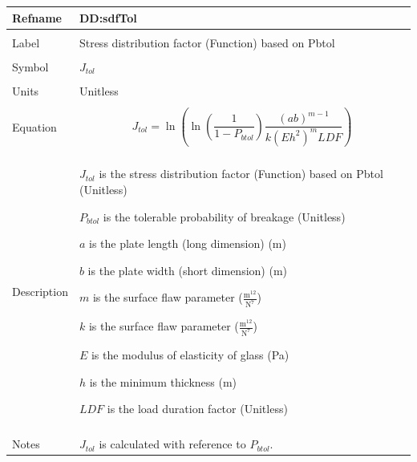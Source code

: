 \documentclass[12pt]{article}
\begin{document}
\noindent \begin{minipage}{\textwidth}
\begin{tabular}{>{\raggedright}p{}>{\raggedright\arraybackslash}p{}}
\toprule \textbf{Refname} & \textbf{DD:sdfTol}
\label{DD:sdfTol}
\\ \midrule \\
Label & Stress distribution factor (Function) based on Pbtol
        
\\ \midrule \\
Symbol & ${J_{tol}}$
         
\\ \midrule \\
Units & Unitless
        
\\ \midrule \\
Equation & \begin{displaymath}
           {J_{tol}}=\ln\left(\ln\left(\frac{1}{1-{P_{btol}}}\right) \frac{\left(a b\right)^{m-1}}{k \left(E h^{2}\right)^{m} LDF}\right)
           \end{displaymath}
\\ \midrule \\
Description & \begin{symbDescription}
              \item{${J_{tol}}$ is the stress distribution factor (Function) based on Pbtol (Unitless)}
              \item{${P_{btol}}$ is the tolerable probability of breakage (Unitless)}
              \item{$a$ is the plate length (long dimension) (m)}
              \item{$b$ is the plate width (short dimension) (m)}
              \item{$m$ is the surface flaw parameter ($\frac{\text{m}^{12}}{\text{N}^{7}}$)}
              \item{$k$ is the surface flaw parameter ($\frac{\text{m}^{12}}{\text{N}^{7}}$)}
              \item{$E$ is the modulus of elasticity of glass (Pa)}
              \item{$h$ is the minimum thickness (m)}
              \item{$LDF$ is the load duration factor (Unitless)}
              \end{symbDescription}
\\ \midrule \\
Notes & ${J_{tol}}$  is calculated with reference to  ${P_{btol}}$.
        

\end{tabular}
\end{minipage}
\end{document}
